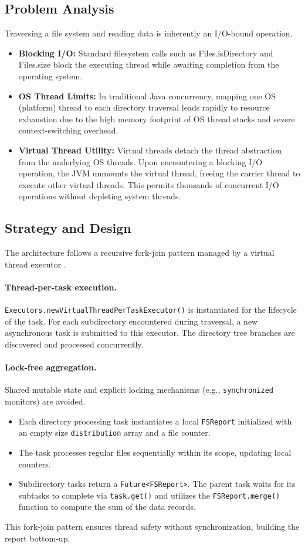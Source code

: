 \documentclass{scrartcl}
\begin{document}
\subsection{Problem Analysis}
Traversing a file system and reading data is inherently an I/O-bound operation.
\begin{itemize}
    \item \textbf{Blocking I/O:} Standard filesystem calls such as Files.isDirectory and Files.size block the executing thread while awaiting completion from the operating system.
    \item \textbf{OS Thread Limits:} In traditional Java concurrency, mapping one OS (platform) thread to each directory traversal leads rapidly to resource exhaustion due to the high memory footprint of OS thread stacks and severe context-switching overhead.
    \item \textbf{Virtual Thread Utility:} Virtual threads detach the thread abstraction from the underlying OS threads. Upon encountering a blocking I/O operation, the JVM unmounts the virtual thread, freeing the carrier thread to execute other virtual threads. This permits thousands of concurrent I/O operations without depleting system threads.
\end{itemize}

\subsection{Strategy and Design}
The architecture follows a recursive fork-join pattern managed by a virtual thread executor .

\paragraph{Thread-per-task execution.}
\texttt{Executors.newVirtualThreadPerTaskExecutor()} is instantiated for the lifecycle of the task. For each subdirectory encountered during traversal, a new asynchronous task is submitted to this executor. The directory tree branches are discovered and processed concurrently.

\paragraph{Lock-free aggregation.}
Shared mutable state and explicit locking mechanisms (e.g., \texttt{synchronized} monitors) are avoided.
\begin{itemize}
    \item Each directory processing task instantiates a local \texttt{FSReport} initialized with an empty size \texttt{distribution} array and a file counter.
    \item The task processes regular files sequentially within its scope, updating local counters.
    \item Subdirectory tasks return a \texttt{Future<FSReport>}. The parent task waits for its subtasks to complete via \texttt{task.get()} and utilizes the \texttt{FSReport.merge()} function to compute the sum of the data records.
\end{itemize}
This fork-join pattern ensures thread safety without synchronization, building the report bottom-up.
\end{document}
